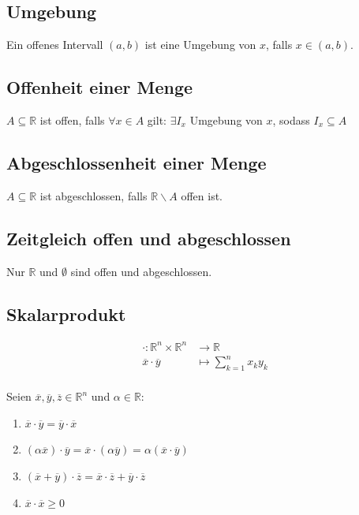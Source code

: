 \documentclass[halfparscip]{scrartcl}
\newcounter{subsection2}
\begin{document}
\subsection{Umgebung}
Ein offenes Intervall $(a,b)$ ist eine Umgebung von $x$, falls $x \in (a,b)$.

\subsection{Offenheit einer Menge}
$A \subseteq \mathbb{R}$ ist offen, falls $\forall x \in A$ gilt: $\exists I_x$ Umgebung von $x$, sodass $I_x \subseteq A$

\subsection{Abgeschlossenheit einer Menge}
$A \subseteq \mathbb{R}$ ist abgeschlossen, falls $\mathbb{R} \backslash A$ offen ist.

\subsection{Zeitgleich offen und abgeschlossen}
Nur $\mathbb{R}$ und $\emptyset$ sind offen und abgeschlossen.

\subsection*{Skalarprodukt}
\begin{align*}
	\cdot: \mathbb{R}^n \times \mathbb{R}^n &\rightarrow \mathbb{R}\\
	\overline{x} \cdot \overline{y} &\mapsto \sum_{k=1}^nx_ky_k\\
\end{align*}

Seien $\overline{x}, \overline{y}, \overline{z} \in \mathbb{R}^n$ und $\alpha \in \mathbb{R}$:
\begin{enumerate}
	\item $\overline{x} \cdot \overline{y} = \overline{y} \cdot \overline{x}$
	\item $(\alpha \overline{x}) \cdot \overline{y} = \overline{x} \cdot (\alpha \overline{y}) = \alpha(\overline{x} \cdot \overline{y})$
	\item $(\overline{x} + \overline{y}) \cdot \overline{z} = \overline{x}\cdot\overline{z} + \overline{y}\cdot\overline{z}$
	\item $\overline{x} \cdot \overline{x} \geq 0$
\end{enumerate}
\end{document}
